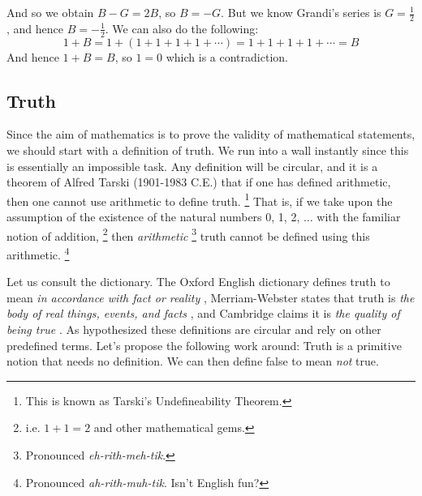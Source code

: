     And so we obtain $B-G=2B$, so $B=\minus{G}$. But we know Grandi's series is
    $G=\frac{1}{2}$, and hence $B=\minus\frac{1}{2}$. We can also do the
    following:
    \begin{equation}
        1+B=1+(1+1+1+1+\cdots)=1+1+1+1+\cdots=B
    \end{equation}
    And hence $1+B=B$, so $1=0$ which is a contradiction.
    \subsection{Truth}
        Since the aim of mathematics is to prove the validity of mathematical
        statements, we should start with a definition of truth. We
        run into a wall instantly since this is essentially an impossible task.
        Any definition will be circular, and it is a theorem of
        Alfred Tarski (1901-1983 C.E.) that if one has
        defined arithmetic, then one cannot use arithmetic to define
        truth.%
        \footnote{%
            This is known as Tarski's Undefineability Theorem.%
        }
        That is, if we take upon the assumption of the existence of the
        natural numbers 0, 1, 2, $\dots$ with the familiar notion of addition,%
        \footnote{%
            i.e. $1+1=2$ and other mathematical gems.
        }
        then \textit{arithmetic}%
        \footnote{%
            Pronounced \textit{eh-rith-meh-tik}.
        }
        truth cannot be defined using this arithmetic.%
        \footnote{%
            Pronounced \textit{ah-rith-muh-tik}. Isn't English fun?
        }
        \par\hfill\par
        Let us consult the dictionary. The Oxford English dictionary defines
        truth to mean \textit{in accordance with fact or reality}
        \cite{OEDTrueDef}, Merriam-Webster states that truth is
        \textit{the body of real things, events, and facts}
        \cite{MerriamWebsterTruthDef}, and Cambridge claims it is
        \textit{the quality of being true} \cite{CambridgeTruthDef}. As
        hypothesized these definitions are circular and rely on other predefined
        terms. Let's propose the following work around: Truth is a
        primitive notion that needs no definition. We can then define
        false to mean \textit{not} true.
        \par
